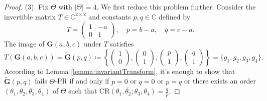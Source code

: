 \documentclass[reqno,a4paper,11pt]{amsart}
\numberwithin{equation}{section}
\def\C{{\mathbb C}}
\newcommand\1{\mathds{1}}
\begin{document}
\begin{proof}
    (3). Fix $\Theta$ with $|\Theta|=4$. We first reduce this problem further. Consider the invertible matrix $T \in \C^{2 \times 2}$ and constants $p,q \in \C$ defined by
    $$
    T = \begin{pmatrix}
        1 & -a \\
        0 & 1
    \end{pmatrix}, \quad p = b-a, \quad q = c-a.
    $$
    The image of $\mathbf{G}(a,b,c)$ under $T$ satisfies
    $$
    T(\mathbf{G}(a,b,c)) = \tilde{\mathbf{G}}(p,q) \coloneqq \left \{  
             \begin{pmatrix}
               1 \\
               0 
             \end{pmatrix},    
             \begin{pmatrix}
               0 \\
               1 
               \end{pmatrix},
               \begin{pmatrix}
               p \\
               1 
               \end{pmatrix},\begin{pmatrix}
               q \\
               1 
               \end{pmatrix}
               \right \}=\{g_1,g_2,g_3,g_4\}.
    $$
    According to Lemma \ref{lemma:invariantTransform}, it's enough to show that $\tilde{\mathbf{G}}(p,q)$ fails $\Theta$-PR if and only if $p=0$ or $q=0$ or $p=q$ or there exists an order $(\theta_1,\theta_2,\theta_3,\theta_4)$ of $\Theta$ such that  $\overline{\mathrm{CR}(\theta_1,\theta_2;\theta_3,\theta_4)}=\frac{q}{p}$.
    

\end{proof}
\end{document}
